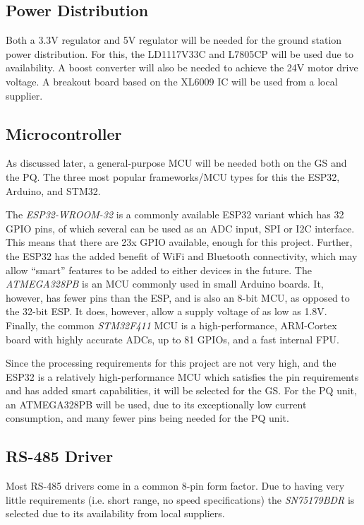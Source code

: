\subsection{Power Distribution}
Both a 3.3V regulator and 5V regulator will be needed for the ground station power distribution. For this, the LD1117V33C and L7805CP will be used due to availability. A boost converter will also be needed to achieve the 24V motor drive voltage. A breakout board based on the XL6009 IC will be used from a local supplier.

\subsection{Microcontroller}
As discussed later, a general-purpose MCU will be needed both on the GS and the PQ. The three most popular frameworks/MCU types for this the ESP32, Arduino, and STM32.

The \textit{ESP32-WROOM-32} is a commonly available ESP32 variant which has 32 GPIO pins, of which several can be used as an ADC input, SPI or I2C interface. This means that there are 23x GPIO available, enough for this project. Further, the ESP32 has the added benefit of WiFi and Bluetooth connectivity, which may allow “smart” features to be added to either devices in the future. The \textit{ATMEGA328PB} is an MCU commonly used in small Arduino boards. It, however, has fewer pins than the ESP, and is also an 8-bit MCU, as opposed to the 32-bit ESP. It does, however, allow a supply  voltage of as low as 1.8V. Finally, the common \textit{STM32F411} MCU is a high-performance, ARM-Cortex board with highly accurate ADCs, up to 81 GPIOs, and a fast internal FPU.

Since the processing requirements for this project are not very high, and the ESP32 is a relatively high-performance MCU which satisfies the pin requirements and has added smart capabilities, it will be selected for the GS. For the PQ unit, an ATMEGA328PB will be used, due to its exceptionally low current consumption, and many fewer pins being needed for the PQ unit.

\subsection{RS-485 Driver}
Most RS-485 drivers come in a common 8-pin form factor. Due to having very little requirements (i.e. short range, no speed specifications) the \textit{SN75179BDR} is selected due to its availability from local suppliers.